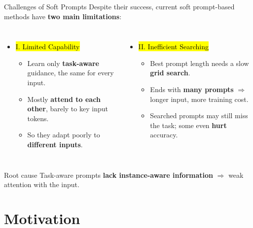 \documentclass[aspectratio=169,11pt]{beamer}
\begin{document}
\begin{frame}{Challenges of Soft Prompts}
\small Despite their success, current soft prompt-based methods have \textbf{two main limitations}:
\begin{columns}[T]
\begin{itemize}
  \item \hl{I. Limited Capability}
  \begin{itemize}\footnotesize\setlength\itemsep{1pt}
    \item Learn only \textbf{task-aware} guidance, the same for every input.
    \item Mostly \textbf{attend to each other}, barely to key input tokens.
    \item So they adapt poorly to \textbf{different inputs}.
  \end{itemize}
\end{itemize}
\begin{itemize}
  \item \hl{II. Inefficient Searching}
  \begin{itemize}\footnotesize\setlength\itemsep{1pt}
    \item Best prompt length needs a slow \textbf{grid search}.
    \item Ends with \textbf{many prompts} $\Rightarrow$ longer input, more training cost.
    \item Searched prompts may still miss the task; some even \textbf{hurt} accuracy.
  \end{itemize}
\end{itemize}
\end{columns}
\vspace{6pt}
\begin{block}{Root cause}
Task-aware prompts \textbf{lack instance-aware information} $\Rightarrow$ weak attention with the input.
\end{block}
\end{frame}

\section{Motivation}
\end{document}
